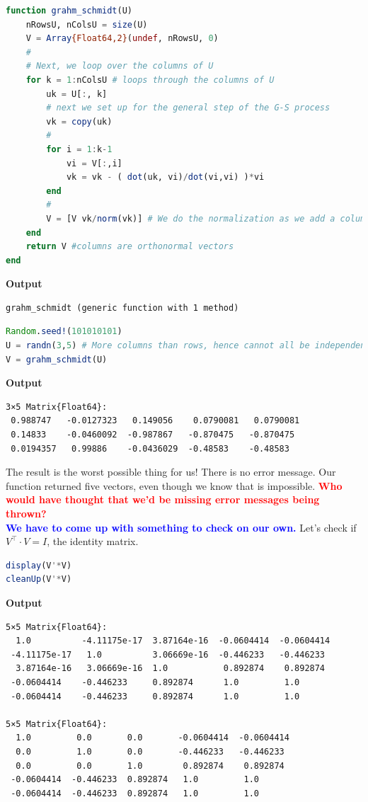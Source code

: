 \begin{lstlisting}[language=Julia,style=mystyle]
function grahm_schmidt(U)
    nRowsU, nColsU = size(U) 
    V = Array{Float64,2}(undef, nRowsU, 0)
    #
    # Next, we loop over the columns of U
    for k = 1:nColsU # loops through the columns of U
        uk = U[:, k] 
        # next we set up for the general step of the G-S process
        vk = copy(uk)
        #
        for i = 1:k-1
            vi = V[:,i]
            vk = vk - ( dot(uk, vi)/dot(vi,vi) )*vi
        end
        #
        V = [V vk/norm(vk)] # We do the normalization as we add a column to V
    end
    return V #columns are orthonormal vectors
end
\end{lstlisting}
\textbf{Output} 
\begin{verbatim}
grahm_schmidt (generic function with 1 method)
\end{verbatim}

\begin{lstlisting}[language=Julia,style=mystyle]
Random.seed!(101010101)
U = randn(3,5) # More columns than rows, hence cannot all be independent.
V = grahm_schmidt(U)
\end{lstlisting}
\textbf{Output} 
\begin{verbatim}
3×5 Matrix{Float64}:
 0.988747   -0.0127323   0.149056    0.0790081   0.0790081
 0.14833    -0.0460092  -0.987867   -0.870475   -0.870475
 0.0194357   0.99886    -0.0436029  -0.48583    -0.48583
\end{verbatim}

The result is the worst possible thing for us! There is no error message. Our function returned five vectors, even though we know that is impossible. \textcolor{red}{\bf Who would have thought that we'd be missing error messages being thrown?}\\

\textcolor{blue}{\bf We have to come up with something to check on our own.} Let's check if $V^\top \cdot V = I$, the identity matrix.

\begin{lstlisting}[language=Julia,style=mystyle]
display(V'*V)
cleanUp(V'*V)
\end{lstlisting}
\textbf{Output} 
\begin{verbatim}
5×5 Matrix{Float64}:
  1.0          -4.11175e-17  3.87164e-16  -0.0604414  -0.0604414
 -4.11175e-17   1.0          3.06669e-16  -0.446233   -0.446233
  3.87164e-16   3.06669e-16  1.0           0.892874    0.892874
 -0.0604414    -0.446233     0.892874      1.0         1.0
 -0.0604414    -0.446233     0.892874      1.0         1.0

5×5 Matrix{Float64}:
  1.0         0.0       0.0       -0.0604414  -0.0604414
  0.0         1.0       0.0       -0.446233   -0.446233
  0.0         0.0       1.0        0.892874    0.892874
 -0.0604414  -0.446233  0.892874   1.0         1.0
 -0.0604414  -0.446233  0.892874   1.0         1.0
\end{verbatim}

